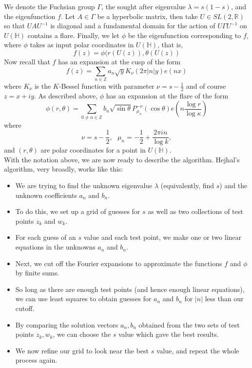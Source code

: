 \documentclass[]{article}
\begin{document}
We denote the Fuchsian group $\Gamma$, the sought after eigenvalue $\lambda = s(1-s)$, and the eigenfunction $f$.
Let $A \in \Gamma$ be a hyperbolic matrix, then take $U \in SL(2, \mathbb{R})$ so that $UAU^{-1}$ is diagonal and a fundamental domain for the action of $U\Gamma U^{-1}$ on $U(\mathbb{H})$ contains a flare.
Finally, we let $\phi$ be the eigenfunction corresponding to $f$, where $\phi$ takes as input polar coordinates in $U(\mathbb{H})$, that is,
$$
f(z) = \phi(r(U(z)), \theta(U(z))
$$
Now recall that $f$ has an expansion at the cusp of the form
$$
f(z) = \sum_{n\in\mathbb{Z}}a_n\sqrt{y}K_\nu(2\pi|n|y)e(nx)
$$
where $K_\nu$ is the $K$-Bessel function with parameter $\nu = s - \frac{1}{2}$ and of course $z = x + iy$.
As described above, $\phi$ has an expansion at the flare of the form
$$
\phi(r, \theta) = \sum_{0 \neq n\in\mathbb{Z}}b_n\sqrt{\sin\theta}P^{-\nu}_{\mu_n}(\cos\theta)e\left( n\frac{\log r}{\log \kappa} \right)
$$
where
$$
\nu = s - \frac{1}{2}, ~~~ \mu_n = -\frac{1}{2} + \frac{2\pi in}{\log k},
$$
and $(r, \theta)$ are polar coordinates for a point in $U(\mathbb{H})$.
\\

With the notation above, we are now ready to describe the algorithm.
Hejhal's algorithm, very broadly, works like this:
\begin{itemize}
	\item We are trying to find the unknown eigenvalue $\lambda$ (equivalently, find $s$) and the unknown coefficients $a_n$ and $b_n$.
	\item To do this, we set up a grid of guesses for $s$ as well as two collections of test points $z_k$ and $w_k$.
	\item For each guess of an $s$ value and each test point, we make one or two linear equations in the unknowns $a_n$ and $b_n$.
	\item Next, we cut off the Fourier expansions to approximate the functions $f$ and $\phi$ by finite sums.
	\item So long as there are enough test points (and hence enough linear equations), we can use least squares to obtain guesses for $a_n$ and $b_n$ for $|n|$ less than our cutoff.
	\item By comparing the solution vectors $a_n, b_n$ obtained from the two sets of test points $z_k, w_k$, we can choose the $s$ value which gave the best results.
	\item We now refine our grid to look near the best $s$ value, and repeat the whole process again.
\end{itemize}
\end{document}
